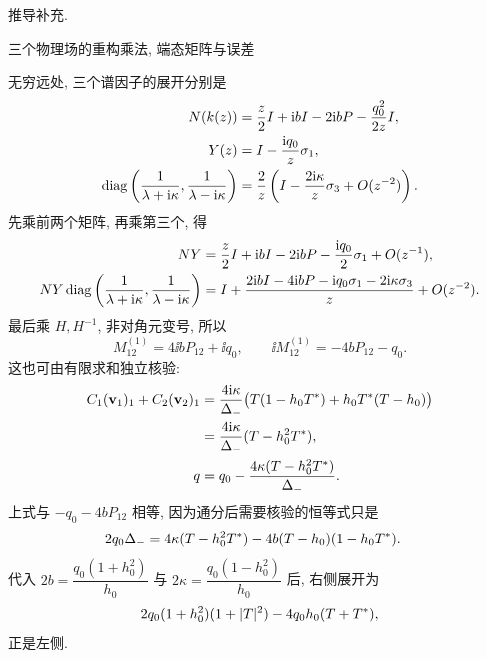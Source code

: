 \par\medskip\noindent 推导补充.\par
\par\medskip\noindent 三个物理场的重构乘法, 端态矩阵与误差\par
无穷远处, 三个谱因子的展开分别是
\begin{equation*}
\begin{aligned}
N(k(z))
&=\dfrac{z}{2}I+\mathrm{i} bI-2\mathrm{i} bP
-\dfrac{q_0^2}{2z}I,\\
Y(z)&=I-\dfrac{\mathrm{i} q_0}{z}\sigma_1,\\
\operatorname{diag}\left(\dfrac{1}{\lambda+\mathrm{i}\kappa},
\dfrac{1}{\lambda-\mathrm{i}\kappa}\right)
&=\dfrac{2}{z}
\left(I-\dfrac{2\mathrm{i}\kappa}{z}\sigma_3+O(z^{-2})\right).
\end{aligned}
\end{equation*}
先乘前两个矩阵, 再乘第三个, 得
\begin{equation*}
\begin{aligned}
NY
&=\dfrac{z}{2}I
+\mathrm{i} bI-2\mathrm{i} bP-\dfrac{\mathrm{i} q_0}{2}\sigma_1
+O(z^{-1}),\\
NY\operatorname{diag}\left(\dfrac{1}{\lambda+\mathrm{i}\kappa},
\dfrac{1}{\lambda-\mathrm{i}\kappa}\right)
&=I+\dfrac{2\mathrm{i} bI-4\mathrm{i} bP-\mathrm{i} q_0\sigma_1-2\mathrm{i}\kappa\sigma_3}{z}
+O(z^{-2}).
\end{aligned}
\end{equation*}
最后乘 $H,H^{-1}$, 非对角元变号, 所以
\begin{equation*}
M^{(1)}_{12}=4\ii bP_{12}+\ii q_0,
\qquad
\ii M^{(1)}_{12}=-4bP_{12}-q_0.
\end{equation*}
这也可由有限求和独立核验:
\begin{equation*}
\begin{aligned}
C_1(\mathbf v_1)_1+C_2(\mathbf v_2)_1
&=\dfrac{4\mathrm{i}\kappa}{\Delta_-}
\bigl(T(1-h_0{T}^{*})+h_0{T}^{*}(T-h_0)\bigr)\\
&=\dfrac{4\mathrm{i}\kappa}{\Delta_-}(T-h_0^2{T}^{*}),\\
q
&=q_0-\dfrac{4\kappa(T-h_0^2{T}^{*})}{\Delta_-}.
\end{aligned}
\end{equation*}
上式与 $-q_0-4bP_{12}$ 相等, 因为通分后需要核验的恒等式只是
\begin{equation*}
\begin{aligned}
2q_0\Delta_-
={}&4\kappa(T-h_0^2{T}^{*})
-4b(T-h_0)(1-h_0{T}^{*}).
\end{aligned}
\end{equation*}
代入 $2b=\dfrac{q_0(1+h_0^2)}{h_0}$ 与
$2\kappa=\dfrac{q_0(1-h_0^2)}{h_0}$ 后, 右侧展开为
\begin{equation*}
2q_0(1+h_0^2)(1+|T|^2)-4q_0h_0(T+{T}^{*}),
\end{equation*}
正是左侧.

